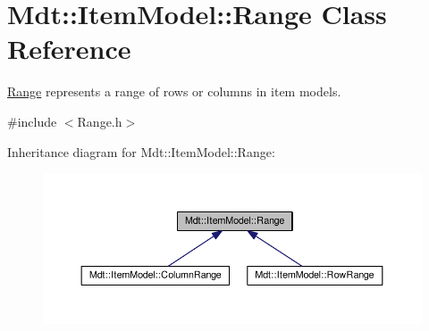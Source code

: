 \hypertarget{class_mdt_1_1_item_model_1_1_range}{}\section{Mdt\+:\+:Item\+Model\+:\+:Range Class Reference}
\label{class_mdt_1_1_item_model_1_1_range}


\hyperlink{class_mdt_1_1_item_model_1_1_range}{Range} represents a range of rows or columns in item models.  




{\ttfamily \#include $<$Range.\+h$>$}



Inheritance diagram for Mdt\+:\+:Item\+Model\+:\+:Range\+:\nopagebreak
\begin{figure}[H]
\begin{center}
\leavevmode
\includegraphics[width=350pt]{class_mdt_1_1_item_model_1_1_range__inherit__graph}
\end{center}
\end{figure}
